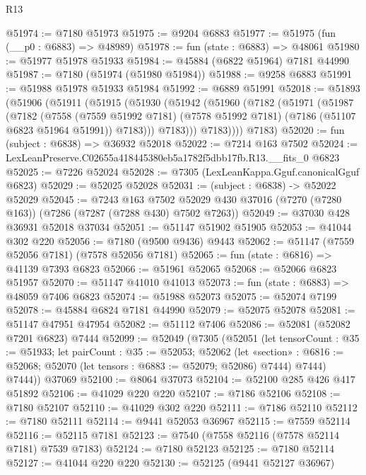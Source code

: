 \begin{lexlean}{R13}
\begin{coremodule}
@51974 := @7180 @51973
@51975 := @9204 @6883
@51977 := @51975 (fun (__p0 : @6883) => @48989)
@51978 := fun (state : @6883) => @48061
@51980 := @51977 @51978 @51933
@51984 := @45884 (@6822 @51964) @7181 @44990
@51987 := @7180 (@51974 (@51980 @51984))
@51988 := @9258 @6883
@51991 := @51988 @51978 @51933 @51984
@51992 := @6889 @51991
@52018 := @51893
    (@51906
      (@51911
        (@51915
          (@51930
            (@51942
              (@51960
                (@7182
                  (@51971
                    (@51987
                      (@7182
                        (@7558
                          (@7559 @51992 @7181)
                          (@7578 @51992 @7181)
                          (@7186 (@51107 @6823 @51964 @51991))
                          @7183)))
                    @7183)))
              @7183))))
      @7183)
@52020 := fun (subject : @6838) => @36932 @52018
@52022 := @7214 @163 @7502
@52024 := LexLeanPreserve.C02655a418445380eb5a1782f5dbb17fb.R13.__fits_0 @6823
@52025 := @7226 @52024
@52028 := @7305 (LexLeanKappa.Gguf.canonicalGguf @6823)
@52029 := @52025 @52028
@52031 := (subject : @6838) -> @52022 @52029
@52045 := @7243
    @163
    @7502
    @52029
    @430
    @37016
    (@7270 (@7280 @163))
    (@7286 (@7287 (@7288 @430) @7502 @7263))
@52049 := @37030 @428 @36931 @52018 @37034
@52051 := @51147 @51902 @51905
@52053 := @41044 @302 @220
@52056 := @7180 (@9500 @9436) @9443
@52062 := @51147 (@7559 @52056 @7181) (@7578 @52056 @7181)
@52065 := fun (state : @6816) => @41139 @7393 @6823
@52066 := @51961 @52065
@52068 := @52066 @6823 @51957
@52070 := @51147 @41010 @41013
@52073 := fun (state : @6883) => @48059 @7406 @6823
@52074 := @51988 @52073
@52075 := @52074 @7199
@52078 := @45884 @6824 @7181 @44990
@52079 := @52075 @52078
@52081 := @51147 @47951 @47954
@52082 := @51112 @7406
@52086 := @52081 (@52082 @7201 @6823) @7444
@52099 := @52049
    (@7305
      (@52051
        (let tensorCount : @35 := @51933;
        let pairCount : @35 := @52053;
        @52062
          (let «section» : @6816 := @52068; @52070 (let tensors : @6883 := @52079; @52086) @7444)
          @7444)
        @7444))
    @37069
@52100 := @8064 @37073
@52104 := @52100 @285 @426 @417 @51892
@52106 := @41029 @220 @220
@52107 := @7186 @52106
@52108 := @7180 @52107
@52110 := @41029 @302 @220
@52111 := @7186 @52110
@52112 := @7180 @52111
@52114 := @9441 @52053 @36967
@52115 := @7559 @52114
@52116 := @52115 @7181
@52123 := @7540 (@7558 @52116 (@7578 @52114 @7181) @7539 @7183)
@52124 := @7180 @52123
@52125 := @7180 @52114
@52127 := @41044 @220 @220
@52130 := @52125 (@9441 @52127 @36967)

\end{coremodule}
\end{lexlean}
